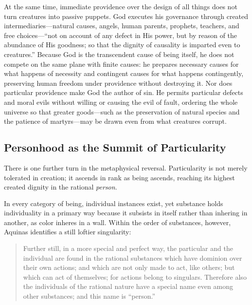 At the same time, immediate providence over the design of all things does not turn creatures into passive puppets. God executes his governance through created intermediaries---natural causes, angels, human parents, prophets, teachers, and free choices---``not on account of any defect in His power, but by reason of the abundance of His goodness; so that the dignity of causality is imparted even to creatures.'' Because God is the transcendent cause of being itself, he does not compete on the same plane with finite causes: he prepares necessary causes for what happens of necessity and contingent causes for what happens contingently, preserving human freedom under providence without destroying it. Nor does particular providence make God the author of sin. He permits particular defects and moral evils without willing or causing the evil of fault, ordering the whole universe so that greater goods---such as the preservation of natural species and the patience of martyrs---may be drawn even from what creatures corrupt.

\subsection{Personhood as the Summit of Particularity}

There is one further turn in the metaphysical reversal. Particularity is not merely tolerated in creation; it ascends in rank as being ascends, reaching its highest created dignity in the rational \textit{person}.

In every category of being, individual instances exist, yet substance holds individuality in a primary way because it subsists in itself rather than inhering in another, as color inheres in a wall. Within the order of substances, however, Aquinas identifies a still loftier singularity:

\begin{quote}
Further still, in a more special and perfect way, the particular and the individual are found in the rational substances which have dominion over their own actions; and which are not only made to act, like others; but which can act of themselves; for actions belong to singulars. Therefore also the individuals of the rational nature have a special name even among other substances; and this name is ``person.''
\end{quote}

